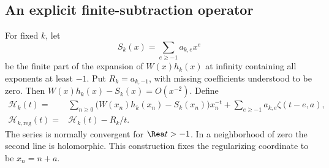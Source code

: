 \subsection{An explicit finite-subtraction operator}
For fixed $k$, let
\begin{equation}\label{hqj:eq:Sk}
S_k(x)=\sum_{e\ge-1}a_{k,e}x^e
\end{equation}
be the finite part of the expansion of $W(x)h_k(x)$ at infinity containing
all exponents at least $-1$. Put $R_k=a_{k,-1}$, with missing coefficients
understood to be zero. Then $W(x)h_k(x)-S_k(x)=O(x^{-2})$.
Define
\begin{align}
\mathcal H_k(t)={}&\sum_{n\ge0}\bigl(W(x_n)h_k(x_n)-S_k(x_n)\bigr)x_n^{-t}
+\sum_{e\ge-1}a_{k,e}\zeta(t-e,a),\label{hqj:eq:Hk}\\
\mathcal H_{k,\mathrm{reg}}(t)={}&\mathcal H_k(t)-R_k/t.
\end{align}
The series is normally convergent for $\Rea t>-1$. In a neighborhood of
zero the second line is holomorphic. This construction fixes the
regularizing coordinate to be $x_n=n+a$.

